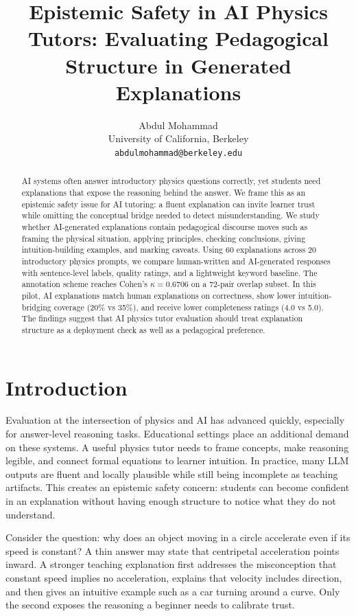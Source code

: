\documentclass{article}
\title{Epistemic Safety in AI Physics Tutors: Evaluating Pedagogical Structure in Generated Explanations}
\author{%
  Abdul Mohammad \\
  University of California, Berkeley \\
  \texttt{abdulmohammad@berkeley.edu}
}
\begin{document}
\maketitle

\begin{abstract}
AI systems often answer introductory physics questions correctly, yet students need explanations that expose the reasoning behind the answer. We frame this as an epistemic safety issue for AI tutoring: a fluent explanation can invite learner trust while omitting the conceptual bridge needed to detect misunderstanding. We study whether AI-generated explanations contain pedagogical discourse moves such as framing the physical situation, applying principles, checking conclusions, giving intuition-building examples, and marking caveats. Using 60 explanations across 20 introductory physics prompts, we compare human-written and AI-generated responses with sentence-level labels, quality ratings, and a lightweight keyword baseline. The annotation scheme reaches Cohen's $\kappa=0.6706$ on a 72-pair overlap subset. In this pilot, AI explanations match human explanations on correctness, show lower intuition-bridging coverage (20\% vs 35\%), and receive lower completeness ratings (4.0 vs 5.0). The findings suggest that AI physics tutor evaluation should treat explanation structure as a deployment check as well as a pedagogical preference.
\end{abstract}

\section{Introduction}
Evaluation at the intersection of physics and AI has advanced quickly, especially for answer-level reasoning tasks. Educational settings place an additional demand on these systems. A useful physics tutor needs to frame concepts, make reasoning legible, and connect formal equations to learner intuition. In practice, many LLM outputs are fluent and locally plausible while still being incomplete as teaching artifacts. This creates an epistemic safety concern: students can become confident in an explanation without having enough structure to notice what they do not understand.

Consider the question: why does an object moving in a circle accelerate even if its speed is constant? A thin answer may state that centripetal acceleration points inward. A stronger teaching explanation first addresses the misconception that constant speed implies no acceleration, explains that velocity includes direction, and then gives an intuitive example such as a car turning around a curve. Only the second exposes the reasoning a beginner needs to calibrate trust.
\end{document}
